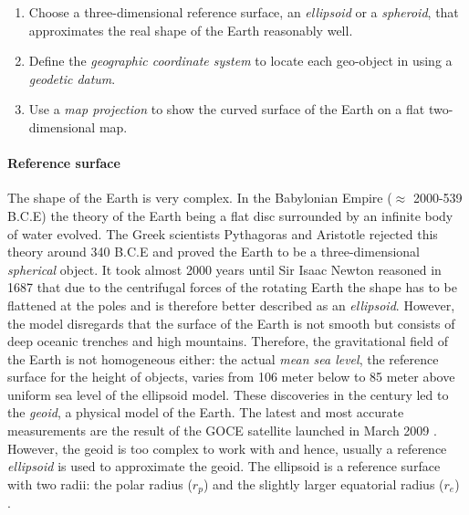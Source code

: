 \begin{enumerate}
  \item Choose a three-dimensional reference surface, an \emph{ellipsoid} or a \emph{spheroid}, that approximates the real shape of the Earth reasonably well.
  \item Define the \emph{geographic coordinate system} to locate each geo-object in using a \emph{geodetic datum}.
  \item Use a \emph{map projection} to show the curved surface of the Earth on a flat two-dimensional map.
\end{enumerate}

\paragraph{Reference surface} %
\label{par:reference_surface}

The shape of the Earth is very complex.
In the Babylonian Empire ($\approx$ 2000-539 B.C.E) the theory of the Earth being a flat disc surrounded by an infinite body of water evolved.
The Greek scientists Pythagoras and Aristotle rejected this theory around 340 B.C.E and proved the Earth to be a three-dimensional \emph{spherical} object.
It took almost 2000 years until Sir Isaac Newton reasoned in 1687 that due to the centrifugal forces of the rotating Earth the shape has to be flattened at the poles and is therefore better described as an \emph{ellipsoid}.
However, the model disregards that the surface of the Earth is not smooth but consists of deep oceanic trenches and high mountains. Therefore, the gravitational field of the Earth is not homogeneous either: the actual \emph{mean sea level}, the reference surface for the height of objects, varies from 106 meter below to 85 meter above uniform sea level of the ellipsoid model. These discoveries in the  century led to the \emph{geoid}, a physical model of the Earth. The latest and most accurate measurements are the result of the GOCE satellite launched in March 2009 \cite{geoid, geoidESRI}.
However, the geoid is too complex to work with and hence, usually a reference \emph{ellipsoid} is used to approximate the geoid. The ellipsoid is a reference surface with two radii: the polar radius ($r_p$) and the slightly larger equatorial radius ($r_e$) \cite[pp. 69-77]{bolstad2008gis}.

